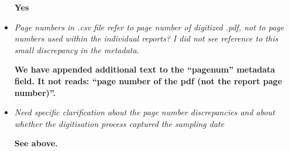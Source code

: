 \documentclass{article}
\begin{document}
\begin{itemize}
\textbf{Yes}

\item \emph{Page numbers in .csv file refer to page number of digitized .pdf, not to page numbers used within the individual reports? I did not see reference to this small discrepancy in the metadata.}

\textbf{We have appended additional text to the “pagenum” metadata field. It not reads: “page number of the pdf (not the report page number)”.}

\item \emph{Need specific clarification about the page number discrepancies and about whether the digitisation process captured the sampling date}

\textbf{See above.}

\end{itemize}
\end{document}

